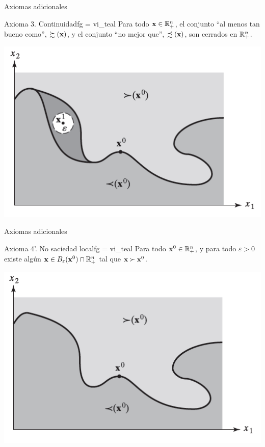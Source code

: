 \documentclass[10pt,aspectratio=169]{beamer}  %
\begin{document}
\begin{frame}{Axiomas adicionales}
	\begin{varblock}{Axioma 3. Continuidad}{fg = vi_teal}
    \vsf
      Para todo $\mathbf{x} \in \mathbb{R}^{n}_{+}$, el conjunto ``al menos tan bueno como'', $\succsim(\mathbf{x})$, y el conjunto
      ``no mejor que'', $\precsim(\mathbf{x})$, son cerrados en $\mathbb{R}^{n}_{+}$. 
    \vsf
  \end{varblock}
  \pause
  \centering
  \includegraphics[scale=.50]{images/fig1.2.png}

\end{frame}


\begin{frame}{Axiomas adicionales}
	\begin{varblock}{Axioma 4'. No saciedad local}{fg = vi_teal}
    \vsf
      Para todo $\mathbf{x}^0 \in \mathbb{R}^{n}_{+}$, y para todo $\varepsilon > 0$ existe algún $\mathbf{x} \in B_\varepsilon(\mathbf{x}^0) \cap \mathbb{R}^{n}_{+}$
      tal que $\mathbf{x} \succ \mathbf{x}^0$. 
    \vsf
  \end{varblock}
  \pause
  \centering
  \includegraphics[scale=.50]{images/fig1.3.png}

\end{frame}
\end{document}
